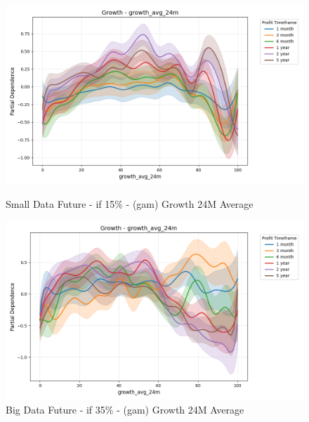 \documentclass[11pt,english,a4paper,hidelinks]{book}
\begin{document}
\begin{figure}[H]
    \centering
    \begin{minipage}{0.48\textwidth}
        \centering
        \includegraphics[width=\textwidth]{images/code/models/general_regression/splines/2D/Small Data future - IF/growth_growth_avg_24m.png}
        \caption{Small Data Future - \acrshort{if} 15\% - (\acrshort{gam}) Growth 24M Average}
        \label{fig:spline_growth_growth_avg_12m}
    \end{minipage}\hfill
    \begin{minipage}{0.48\textwidth}
        \centering
        \includegraphics[width=\textwidth]{images/code/models/general_regression/splines/2D/Big Data future - IF HARD Balanced/growth_growth_avg_24m.png}
        \caption{Big Data Future - \acrshort{if} 35\% - (\acrshort{gam}) Growth 24M Average}
        \label{fig:spline_growth_growth_avg_12m_balanced}
    \end{minipage}
\end{figure}
\end{document}
